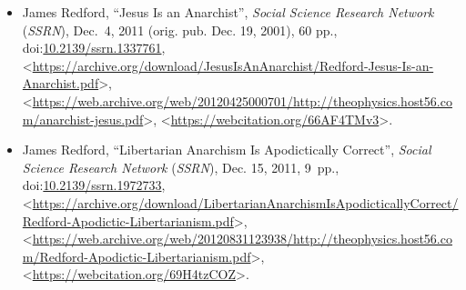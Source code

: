 \documentclass[letterpaper,11pt]{article}
\newcommand{\dsc}{\discretionary{}{}{}}
\begin{document}
\begin{itemize}
\item James Redford, ``Jesus Is an Anarchist'', \emph{Social Science Research Network} (\emph{SSRN}), Dec.~4, 2011 (orig. pub. Dec. 19, 2001), 60 pp., doi:\discretionary{}{}{}\href{https://dx.doi.org/10.2139/ssrn.1337761}{10\dsc .2139/\dsc ssrn\dsc .1337761}, \textless\href{https://archive.org/download/JesusIsAnAnarchist/Redford-Jesus-Is-an-Anarchist.pdf}{\textsf{https\dsc :\dsc //\dsc archive\dsc .org/\dsc download/\dsc Jesus\dsc Is\dsc An\dsc Anarchist/\dsc Redford\dsc -Jesus\dsc -Is\dsc -an\dsc -Anarchist\dsc .pdf}}\textgreater , \textless\href{https://web.archive.org/web/20120425000701/http://theophysics.host56.com/anarchist-jesus.pdf}{\textsf{https\dsc :\dsc //\dsc web\dsc .archive\dsc .org/\dsc web/\dsc 20120425000701/\dsc http\dsc :\dsc //\dsc theophysics\dsc .host56\dsc .com/\dsc anarchist\dsc -jesus\dsc .pdf}}\textgreater , \textless\href{https://webcitation.org/66AF4TMv3}{\textsf{https\dsc :\dsc //\dsc webcitation\dsc .org/\dsc 66AF4TMv3}}\textgreater .

\item James Redford, ``Libertarian Anarchism Is Apodictically Correct'', \emph{Social Science Research Network} (\emph{SSRN}), Dec. 15, 2011, 9~pp., doi:\discretionary{}{}{}\href{https://dx.doi.org/10.2139/ssrn.1972733}{10\dsc .2139/\dsc ssrn\dsc .1972733}, \textless\href{https://archive.org/download/LibertarianAnarchismIsApodicticallyCorrect/Redford-Apodictic-Libertarianism.pdf}{\textsf{https\dsc :\dsc //\dsc archive\dsc .org/\dsc download/\dsc Libertarian\dsc Anarchism\dsc Is\dsc Apodictically\dsc Correct/\dsc Redford\dsc -Apodictic\dsc -Libertarianism\dsc .pdf}}\textgreater , \textless\href{https://web.archive.org/web/20120831123938/http://theophysics.host56.com/Redford-Apodictic-Libertarianism.pdf}{\textsf{https\dsc :\dsc //\dsc web\dsc .archive\dsc .org/\dsc web/\dsc 20120831\dsc 123938/\dsc http\dsc :\dsc //\dsc theophysics\dsc .host56\dsc .com/\dsc Redford\dsc -Apodictic\dsc -Libertarianism\dsc .pdf}}\textgreater , \textless\href{https://webcitation.org/69H4tzCOZ}{\textsf{https\dsc :\dsc //\dsc webcitation\dsc .org/\dsc 69H4tzCOZ}}\textgreater .


\end{itemize}
\end{document}

